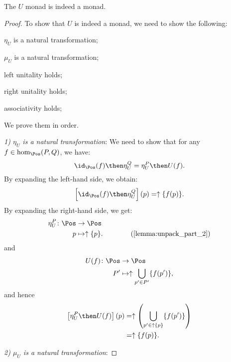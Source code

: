 \begin{lemma}
The $U$ monad is indeed a monad.
\end{lemma}
\begin{proof}
To show that $U$ is indeed a monad, we need to show the following:
\begin{compactenum}
    \item $\eta_U$ is a natural transformation;
    \item $\mu_U$ is a natural transformation;
    \item left unitality holds;
    \item right unitality holds;
    \item associativity holds;
\end{compactenum}
We prove them in order.

\emph{1) $\eta_U$ is a natural transformation}: We need to show that for any $f\in \hom_{\Pos}(P,Q)$, we have:
\begin{equation}
    \id_{\Pos}(f)\then \eta_{U}^Q=\eta_{U}^P\then U(f).
\end{equation}
By expanding the left-hand side, we obtain:
\begin{equation}
    \left[\id_{\Pos}(f)\then \eta_{U}^Q\right](p)=\uparrow \{f(p)\}.
\end{equation}
By expanding the right-hand side, we get:
\begin{equation}
    \begin{aligned}
    \eta_{U}^P\colon \Pos &\to \Pos\\
    p&\mapsto \uparrow \{p\}. \qquad \qquad (\cref{lemma:unpack_part_2})
    \end{aligned}
\end{equation}
and
\begin{equation}
    \begin{aligned}
    U(f)\colon \Pos &\to \Pos\\
    P'&\mapsto \uparrow \bigcup_{p'\in P'}\{f(p')\},
    \end{aligned}
\end{equation}
and hence
\begin{equation}
    \begin{aligned}
    \left[\eta_{U}^P\then U(f)\right](p)&=\uparrow \left( \bigcup_{p'\in \uparrow \{p\}} \{f(p')\}\right)\\
    &=\uparrow \{f(p)\}.
    \end{aligned}
\end{equation}

\emph{2) $\mu_U$ is a natural transformation}:
\end{proof}
